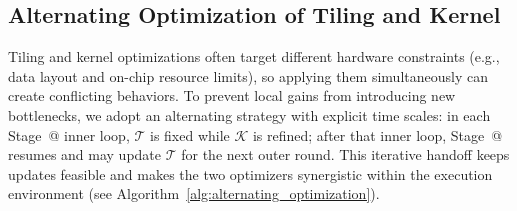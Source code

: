 \documentclass{article}
\makeatletter
\theoremstyle{plain}
\theoremstyle{definition}
\theoremstyle{remark}
\newcommand{\Rmnum}[1]{\expandafter\@slowromancap\romannumeral #1@}
\makeatother
\begin{document}
\subsection{Alternating Optimization of Tiling and Kernel}

Tiling and kernel optimizations often target different hardware constraints (e.g., data layout and on-chip resource limits), so applying them simultaneously can create conflicting behaviors. To prevent local gains from introducing new bottlenecks, we adopt an alternating strategy with explicit time scales: in each Stage~\Rmnum{2} inner loop, $\mathcal{T}$ is fixed while $\mathcal{K}$ is refined; after that inner loop, Stage~\Rmnum{1} resumes and may update $\mathcal{T}$ for the next outer round. This iterative handoff keeps updates feasible and makes the two optimizers synergistic within the execution environment (see Algorithm~\ref{alg:alternating_optimization}).
\end{document}
